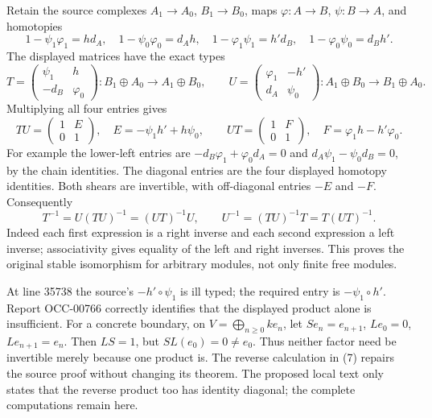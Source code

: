 Retain the source complexes \(A_1\to A_0\), \(B_1\to B_0\), maps \(\varphi:A\to B\), \(\psi:B\to A\), and homotopies \[
1-\psi_1\varphi_1=hd_A,\quad1-\psi_0\varphi_0=d_Ah,
\quad1-\varphi_1\psi_1=h'd_B,\quad1-\varphi_0\psi_0=d_Bh'.
\] The displayed matrices have the exact types \[
T=\begin{pmatrix}\psi_1&h\\-d_B&\varphi_0\end{pmatrix}:
B_1\oplus A_0\to A_1\oplus B_0,
\qquad
U=\begin{pmatrix}\varphi_1&-h'\\d_A&\psi_0\end{pmatrix}:
A_1\oplus B_0\to B_1\oplus A_0.
\] Multiplying all four entries gives \[
TU=\begin{pmatrix}1&E\\0&1\end{pmatrix},\quad E=-\psi_1h'+h\psi_0,
\qquad
UT=\begin{pmatrix}1&F\\0&1\end{pmatrix},\quad F=\varphi_1h-h'\varphi_0.
\tag{7}
\] For example the lower-left entries are \(-d_B\varphi_1+\varphi_0d_A=0\) and \(d_A\psi_1-\psi_0d_B=0\), by the chain identities. The diagonal entries are the four displayed homotopy identities. Both shears are invertible, with off-diagonal entries \(-E\) and \(-F\). Consequently \[
T^{-1}=U(TU)^{-1}=(UT)^{-1}U,\qquad
U^{-1}=(TU)^{-1}T=T(UT)^{-1}.
\] Indeed each first expression is a right inverse and each second expression a left inverse; associativity gives equality of the left and right inverses. This proves the original stable isomorphism for arbitrary modules, not only finite free modules.

At line 35738 the source's \(-h'\circ\psi_1\) is ill typed; the required entry is \(-\psi_1\circ h'\). Report OCC-00766 correctly identifies that the displayed product alone is insufficient. For a concrete boundary, on \(V=\bigoplus_{n\geq0}ke_n\), let \(Se_n=e_{n+1}\), \(Le_0=0\), \(Le_{n+1}=e_n\). Then \(LS=1\), but \(SL(e_0)=0\ne e_0\). Thus neither factor need be invertible merely because one product is. The reverse calculation in (7) repairs the source proof without changing its theorem. The proposed local text only states that the reverse product too has identity diagonal; the complete computations remain here.

